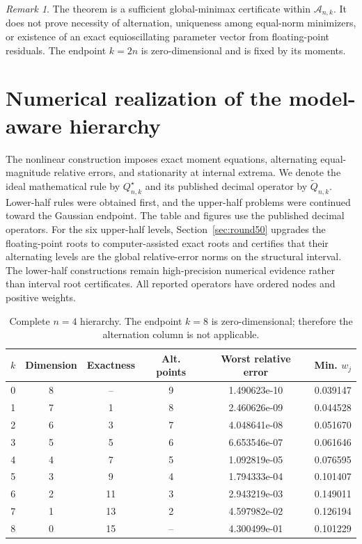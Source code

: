 \documentclass[preprint,12pt]{elsarticle}
\theoremstyle{remark}
\newtheorem{remark}[theorem]{Remark}
\begin{document}
\begin{remark}
The theorem is a sufficient global-minimax certificate within
\(\mathcal A_{n,k}\). It does not prove necessity of alternation,
uniqueness among equal-norm minimizers, or existence of an exact
equioscillating parameter vector from floating-point residuals. The
endpoint \(k=2n\) is zero-dimensional and is fixed by its moments.
\end{remark}


\section{Numerical realization of the model-aware hierarchy}

The nonlinear construction imposes exact moment equations, alternating
equal-magnitude relative errors, and stationarity at internal extrema.
We denote the ideal mathematical rule by \(Q_{n,k}^\star\) and its
published decimal operator by \(\widetilde Q_{n,k}\). Lower-half rules
were obtained first, and the upper-half problems were continued toward
the Gaussian endpoint. The table and figures use the published decimal
operators. For the six upper-half levels, Section~\ref{sec:round50}
upgrades the floating-point roots to computer-assisted exact roots and
certifies that their alternating levels are the global relative-error
norms on the structural interval. The lower-half constructions remain
high-precision numerical evidence rather than interval root certificates.
All reported operators have ordered nodes and positive weights.

\begin{table}[ht]
\centering
\caption{Complete \(n=4\) hierarchy. The endpoint \(k=8\) is
zero-dimensional; therefore the alternation column is not applicable.}
\label{tab:full-hierarchy}
\small
\begin{tabular}{cccccc}
\toprule
\(k\) & Dimension & Exactness & Alt. points &
Worst relative error & Min. \(w_j\)\\
\midrule
0 & 8 & -- & 9 & 1.490623e-10 & 0.039147 \\
1 & 7 & 1 & 8 & 2.460626e-09 & 0.044528 \\
2 & 6 & 3 & 7 & 4.048641e-08 & 0.051670 \\
3 & 5 & 5 & 6 & 6.653546e-07 & 0.061646 \\
4 & 4 & 7 & 5 & 1.092819e-05 & 0.076595 \\
5 & 3 & 9 & 4 & 1.794333e-04 & 0.101407 \\
6 & 2 & 11 & 3 & 2.943219e-03 & 0.149011 \\
7 & 1 & 13 & 2 & 4.597982e-02 & 0.126194 \\
8 & 0 & 15 & -- & 4.300499e-01 & 0.101229 \\
\bottomrule
\end{tabular}
\end{table}
\end{document}
